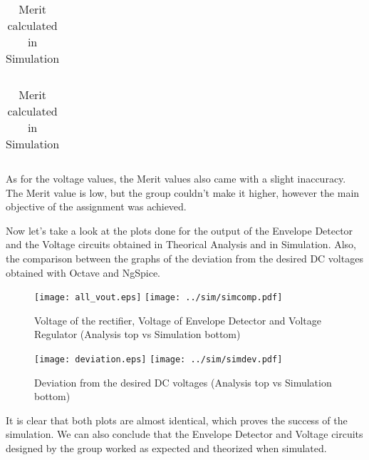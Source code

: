 \begin{table}[H]
	\begin{minipage}{.5\linewidth}
		\centering
		\begin{tabular}{|c|c|}
		\hline
		
		\end{tabular}
		\caption{Merit calculated in Theoretical Analysis}
		\label{table1a}
	\end{minipage}
	\begin{minipage}{.5\linewidth}
		\centering
		\begin{tabular}{|c|c|}
		\hline
		
		\end{tabular}
 		\caption{Merit calculated in Simulation}
		\label{table1b}
	\end{minipage} 
\end{table}

\par As for the voltage values, the Merit values also came with a slight inaccuracy. The Merit value is low, but the group couldn't make it higher, however the main objective of the assignment was achieved.
\newpage{}
\par Now let's take a look at the plots done for the output of the Envelope Detector and the Voltage circuits obtained in Theorical Analysis and in Simulation. Also, the comparison between the graphs of the deviation from the desired DC voltages obtained with Octave and NgSpice.

\begin{figure}[H]
    \texttt{[image: all\_vout.eps]}
    \hfill\texttt{[image: ../sim/simcomp.pdf]}
    \centering
    \caption{Voltage of the rectifier, Voltage of Envelope Detector and Voltage Regulator (Analysis top vs Simulation bottom)}
    \label{mag}
\end{figure}

\begin{figure}[H]
    \texttt{[image: deviation.eps]}
    \hfill\texttt{[image: ../sim/simdev.pdf]}
    \centering
    \caption{Deviation from the desired DC voltages (Analysis top vs Simulation bottom)}
    \label{mag}
\end{figure}

\par It is clear that both plots are almost identical, which proves the success of the simulation. We can also conclude that the Envelope Detector and Voltage circuits designed by the group worked as expected and theorized when simulated.

